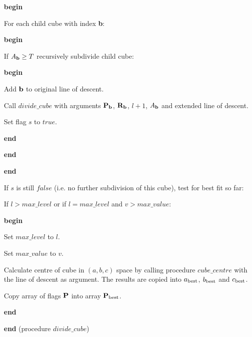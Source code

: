 \begin{indent_para}
     {\bf begin}
     \begin{indent_para}
      For each child cube with index {\bf b}:

      {\bf begin}
      \begin{indent_para}
       If $A_{\bf b} \geq T$ recursively subdivide child cube:

       {\bf begin}
       \begin{indent_para}
	Add ${\bf b}$ to original line of descent.

        Call $divide\_cube$ with arguments ${\bf P}_{\bf b}$,
	${\bf R}_{\bf b}$, $l+1$, $A_{\bf b}$ and extended line of descent.

	Set flag $s$ to $true$.
       \end{indent_para}
       {\bf end}
      \end{indent_para}
      {\bf end}
     \end{indent_para}
     {\bf end}

     If $s$ is still $false$ (i.e. no further
     subdivision of this cube), test for best fit so far:

     \begin{indent_para}
      If $l > max\_level$ or if $l = max\_level$ and $v > max\_value$:

      {\bf begin}
      \begin{indent_para}
       Set $max\_level$ to $l$.

       Set $max\_value$ to $v$.

       Calculate centre of cube in $(a,b,c)$ space by calling procedure
       $cube\_centre$ with the line of descent as argument. The results are
       copied into $a_{\rm best}$, $b_{\rm best}$ and $c_{\rm best}$.

       Copy array of flags ${\bf P}$ into array ${\bf P}_{\rm best}$.
      \end{indent_para}
      {\bf end}
     \end{indent_para}
    \end{indent_para}
    {\bf end} (procedure $divide\_cube$)

